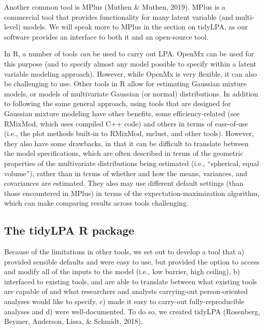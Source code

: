 \documentclass[man]{apa6}
\begin{document}
Another common tool is MPlus (Muthen \& Muthen, 2019). MPlus is a commercial tool
that provides functionality for many latent variable (and multi-level) models.
We will speak more to MPlus in the section on tidyLPA, as our software provides
an interface to both it and an open-source tool.

In R, a number of tools \emph{can} be used to carry out LPA. OpenMx can be used for
this purpose (and to specify almost any model possible to specify within a
latent variable modeling approach). However, while OpenMx is very flexible, it
can also be challenging to use. Other tools in R allow for estimating Gaussian
mixture models, or models of multivariate Gaussian (or normal) distributions. In
addition to following the same general approach, using tools that are designed
for Gaussian mixture modeling have other benefits, some efficiency-related (see
RMixMod, which uses compiled C++ code) and others in terms of ease-of-use (i.e.,
the plot methods built-in to RMixMod, mclust, and other tools). However, they
also have some drawbacks, in that it can be difficult to translate between the
model specifications, which are often described in terms of the geometric
properties of the multivariate distributions being estimated (i.e., \enquote{spherical,
equal volume}), rather than in terms of whether and how the means, variances,
and covariances are estimated. They also may use different default settings
(than those encountered in MPlus) in terms of the expectation-maximization
algorithm, which can make comparing results across tools challenging.

\hypertarget{the-tidylpa-r-package}{%
\subsection{The tidyLPA R package}\label{the-tidylpa-r-package}}

Because of the limitations in other tools, we set out to develop a tool that a)
provided sensible defaults and were easy to use, but provided the option to
access and modify all of the inputs to the model (i.e., low barrier, high
ceiling), b) interfaced to existing tools, and are able to translate between
what existing tools are capable of and what researchers and analysts
carrying-out person-oriented analyses would like to specify, c) made it easy to
carry-out fully-reproducible analyses and d) were well-documented. To do so, we
created tidyLPA (Rosenberg, Beymer, Anderson, Lissa, \& Schmidt, 2018).
\end{document}
